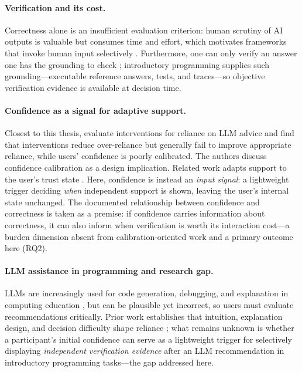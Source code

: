 \documentclass[oneside,final,14pt,a4paper]{extreport}
\begin{document}
\paragraph{Verification and its cost.}
Correctness alone is an insufficient evaluation criterion: human scrutiny of
AI outputs is valuable but consumes time and effort, which motivates
frameworks that invoke human input selectively \cite{CascadedLM2025}.
Furthermore, one can only verify an answer one has the grounding to check
\cite{Zhang2024Verify}; introductory programming supplies such
grounding---executable reference answers, tests, and traces---so objective
verification evidence is available at decision time.

\paragraph{Confidence as a signal for adaptive support.}
Closest to this thesis, \cite{Bo2025} evaluate interventions for reliance on
LLM advice and find that interventions reduce over-reliance but generally
fail to improve appropriate reliance, while users' confidence is poorly
calibrated. The authors discuss confidence calibration as a design
implication. Related work adapts support to the user's trust state
\cite{SrinivasanAdjustForTrust}. Here, confidence is instead an
\emph{input signal}: a lightweight trigger deciding \emph{when} independent
support is shown, leaving the user's internal state unchanged. The documented
relationship between confidence and correctness is taken as a premise: if
confidence carries information about correctness, it can also inform when
verification is worth its interaction cost---a burden dimension absent from
calibration-oriented work and a primary outcome here (RQ2).

\paragraph{LLM assistance in programming and research gap.}
LLMs are increasingly used for code generation, debugging, and explanation in
computing education \cite{Ma2024,Cambaz2024,Denny2024}, but can be plausible
yet incorrect, so users must evaluate recommendations critically. Prior work
establishes that intuition, explanation design, and decision difficulty shape
reliance \cite{Chen2023,Vasconcelos2022,Zhang2024Verify}; what remains
unknown is whether a participant's initial confidence can serve as a
lightweight trigger for selectively displaying \emph{independent verification
evidence} after an LLM recommendation in introductory programming
tasks---the gap addressed here.
\end{document}
